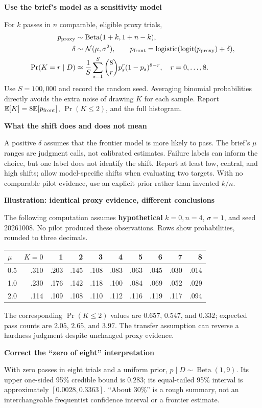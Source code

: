 \documentclass[11pt,a4paper]{article}
\newcommand{\sub}[1]{\vspace{4pt}\textbf{#1}\par}
\newcommand{\E}{\mathbb{E}}
\begin{document}
\sub{Use the brief's model as a sensitivity model}
For $k$ passes in $n$ comparable, eligible proxy trials,
\begin{align*}
p_{\rm proxy}&\sim\operatorname{Beta}(1+k,1+n-k),\\
\delta&\sim\mathcal N(\mu,\sigma^2),\qquad
p_{\rm front}=\operatorname{logistic}(\operatorname{logit}(p_{\rm proxy})+\delta),\\
\Pr(K=r\mid D)&\approx\frac1S\sum_{s=1}^{S}\binom8r p_s^r(1-p_s)^{8-r},\quad r=0,\ldots,8.
\end{align*}
Use $S=100{,}000$ and record the random seed. Averaging binomial probabilities directly avoids the extra noise of drawing $K$ for each sample. Report $\E[K]=8\E[p_{\rm front}]$, $\Pr(K\leq2)$, and the full histogram.

\sub{What the shift does and does not mean}
A positive $\delta$ assumes that the frontier model is more likely to pass. The brief's $\mu$ ranges are judgment calls, not calibrated estimates. Failure labels can inform the choice, but one label does not identify the shift. Report at least low, central, and high shifts; allow model-specific shifts when evaluating two targets. With no comparable pilot evidence, use an explicit prior rather than invented $k/n$.

\sub{Illustration: identical proxy evidence, different conclusions}
The following computation assumes \textbf{hypothetical} $k=0,n=4$, $\sigma=1$, and seed 20261008. No pilot produced these observations. Rows show probabilities, rounded to three decimals.

{\small
\begin{tabular}{@{}lrrrrrrrrr@{}}
\toprule
$\mu$ & $K=0$ & 1 & 2 & 3 & 4 & 5 & 6 & 7 & 8\\
\midrule
0.5 & .310 & .203 & .145 & .108 & .083 & .063 & .045 & .030 & .014\\
1.0 & .230 & .176 & .142 & .118 & .100 & .084 & .069 & .052 & .029\\
2.0 & .114 & .109 & .108 & .110 & .112 & .116 & .119 & .117 & .094\\
\bottomrule
\end{tabular}}

The corresponding $\Pr(K\leq2)$ values are $0.657$, $0.547$, and $0.332$; expected pass counts are $2.05$, $2.65$, and $3.97$. The transfer assumption can reverse a hardness judgment despite unchanged proxy evidence.

\sub{Correct the ``zero of eight'' interpretation}
With zero passes in eight trials and a uniform prior, $p\mid D\sim\operatorname{Beta}(1,9)$. Its upper one-sided 95\% credible bound is $0.283$; its equal-tailed 95\% interval is approximately $[0.0028,0.3363]$. ``About 30\%'' is a rough summary, not an interchangeable frequentist confidence interval or a frontier estimate.
\end{document}
